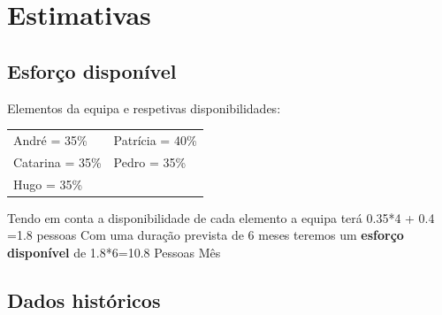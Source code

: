 \documentclass[a4paper]{report}
\begin{document}
\section{Estimativas}
\subsection{Esforço disponível}
Elementos da equipa e respetivas disponibilidades:\\

\begin{tabularx}{\textwidth}{XX}
	André = 35\%    & Patrícia = 40\% \\
	Catarina = 35\% & Pedro = 35\%    \\
	Hugo = 35\%     &
\end{tabularx}
\linebreak\linebreak
Tendo em conta a disponibilidade de cada elemento a equipa terá 0.35*4 + 0.4 =1.8 pessoas\linebreak
Com uma duração prevista de 6 meses teremos um \textbf{esforço disponível} de 1.8*6=10.8 Pessoas Mês
\subsection{Dados históricos}
\end{document}
